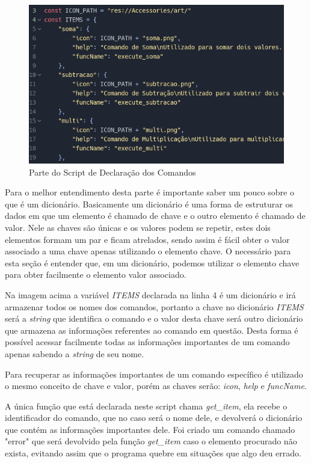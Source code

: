 \begin{figure}[H]
    \includegraphics[width=\textwidth]{../figuras/declaracao_comandos.png}
    \caption{Parte do Script de Declaração dos Comandos}
\end{figure}

Para o melhor entendimento desta parte é importante saber um pouco sobre o que é
um dicionário. Basicamente um dicionário é uma forma de estruturar
os dados em que um elemento é chamado de chave e o outro elemento é chamado
de valor. Nele as chaves são únicas e os valores podem se repetir, estes dois
elementos formam um par e ficam atrelados, sendo assim é fácil obter
o valor associado a uma chave apenas utilizando o elemento chave. O necessário
para esta seção é entender que, em um dicionário, podemos utilizar o elemento 
chave para obter facilmente o elemento valor associado.

Na imagem acima a variável \textit{ITEMS} declarada na linha 4 é um dicionário 
e irá armazenar todos os nomes
dos comandos, portanto a chave no dicionário \textit{ITEMS} será a 
\textit{string} que identifica o comando e o valor desta chave será outro 
dicionário que armazena as informações referentes ao comando em questão. Desta 
forma é possível acessar facilmente todas as informações importantes de um 
comando apenas sabendo a \textit{string} de seu nome.

Para recuperar as informações importantes de um comando específico é utilizado 
o mesmo conceito de chave e valor, porém as chaves serão: \textit{icon}, 
\textit{help} e \textit{funcName}.

A única função que está declarada neste script chama \textit{get\_item},
ela recebe o identificador do comando, que no caso será o nome dele, e devolverá
o dicionário que contém as informações importantes dele. Foi criado
um comando chamado "error" que será devolvido pela função \textit{get\_item}
caso o elemento procurado não exista, evitando assim que o programa quebre em 
situações que algo deu errado.

